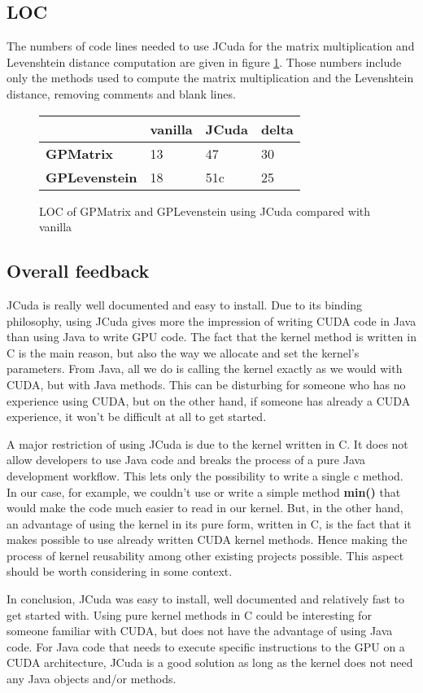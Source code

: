 \subsection{LOC}

The numbers of code lines needed to use JCuda for the matrix multiplication and Levenshtein distance computation are given in figure \ref{table jcuda loc}. Those numbers include only the methods used to compute the matrix multiplication and the Levenshtein distance, removing comments and blank lines.

\begin{figure}[H]
\begin{center}
\begin{tabular}{ |l|l|l|l| } 
 \hline
 & \textbf{vanilla} & \textbf{JCuda} & \textbf{delta} \\
 \hline
 \textbf{GPMatrix} & 13 & 47 & 30 \\ 
 \hline
 \textbf{GPLevenstein} & 18 & 51c & 25 \\ 
 \hline
\end{tabular}
\end{center}
\caption{LOC of GPMatrix and GPLevenstein using JCuda compared with vanilla}
\label{table jcuda loc}
\end{figure}

\subsection{Overall feedback}

JCuda is really well documented and easy to install. Due to its binding philosophy, using JCuda gives more the impression of writing CUDA code in Java than using Java to write GPU code. The fact that the kernel method is written in C is the main reason, but also the way we allocate and set the kernel's parameters. From Java, all we do is calling the kernel exactly as we would with CUDA, but with Java methods. This can be disturbing for someone who has no experience using CUDA, but on the other hand, if someone has already a CUDA experience, it won't be difficult at all to get started.

A major restriction of using JCuda is due to the kernel written in C. It does not allow developers to use Java code and breaks the process of a pure Java development workflow. This lets only the possibility to write a single c method. In our case, for example, we couldn't use or write a simple method \textbf{min()} that would make the code much easier to read in our kernel. But, in the other hand, an advantage of using the kernel in its pure form, written in C, is the fact that it makes possible to use already written CUDA kernel methods. Hence making the process of kernel reusability among other existing projects possible. This aspect should be worth considering in some context.

In conclusion, JCuda was easy to install, well documented and relatively fast to get started with. Using pure kernel methods in C could be interesting for someone familiar with CUDA, but does not have the advantage of using Java code. For Java code that needs to execute specific instructions to the GPU on a CUDA architecture, JCuda is a good solution as long as the kernel does not need any Java objects and/or methods.